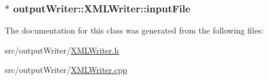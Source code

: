 \subsubsection[{\texorpdfstring{input\+File}{inputFile}}]{$\ast$ output\+Writer\+::\+X\+M\+L\+Writer\+::input\+File\hspace{0.3cm}{\ttfamily [private]}}\hypertarget{classoutputWriter_1_1XMLWriter_ad9f7b00f811d520043497bbe15b5c078}{}\label{classoutputWriter_1_1XMLWriter_ad9f7b00f811d520043497bbe15b5c078}


The documentation for this class was generated from the following files\+:\begin{DoxyCompactItemize}
\item 
src/output\+Writer/\hyperlink{XMLWriter_8h}{X\+M\+L\+Writer.\+h}\item 
src/output\+Writer/\hyperlink{XMLWriter_8cpp}{X\+M\+L\+Writer.\+cpp}\end{DoxyCompactItemize}
